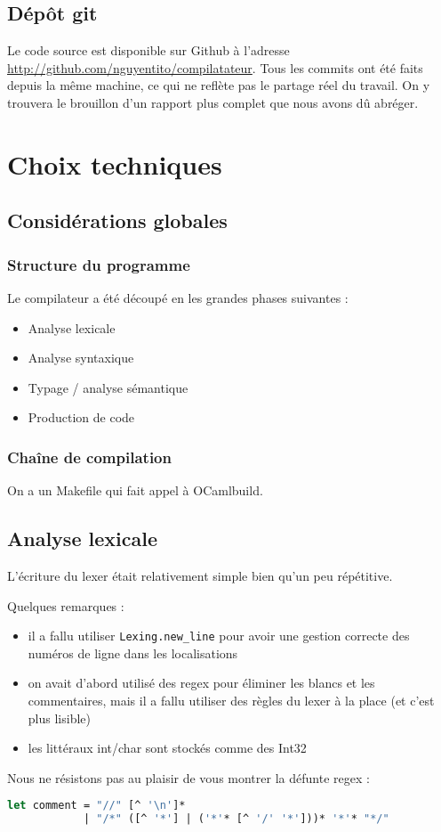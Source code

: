 \documentclass[a4paper, 11pt]{article}
\begin{document}
\subsection{Dépôt git}

Le code source est disponible sur Github à l'adresse \url{http://github.com/nguyentito/compilatateur}.
Tous les commits ont été faits depuis la même machine, ce qui ne reflète pas le partage réel du travail. On y trouvera le brouillon d'un rapport plus complet que nous avons dû abréger.

\section{Choix techniques}

\subsection{Considérations globales}

\subsubsection{Structure du programme}

Le compilateur a été découpé en les grandes phases suivantes :
\begin{itemize}
\item Analyse lexicale
\item Analyse syntaxique
\item Typage / analyse sémantique
\item Production de code
\end{itemize}

\subsubsection{Chaîne de compilation}

On a un Makefile qui fait appel à OCamlbuild.

\subsection{Analyse lexicale}

L'écriture du lexer était relativement simple bien qu'un peu répétitive.

Quelques remarques :
\begin{itemize}
\item il a fallu utiliser \texttt{Lexing.new\_line} pour avoir une gestion correcte
  des numéros de ligne dans les localisations
\item on avait d'abord utilisé des regex pour éliminer les blancs et les commentaires,
  mais il a fallu utiliser des règles du lexer à la place (et c'est plus lisible)
\item les littéraux int/char sont stockés comme des Int32
\end{itemize}
Nous ne résistons pas au plaisir de vous montrer la défunte regex :
\begin{lstlisting}[language=Caml]
let comment = "//" [^ '\n']*
            | "/*" ([^ '*'] | ('*'* [^ '/' '*']))* '*'* "*/"
\end{lstlisting}
\end{document}
